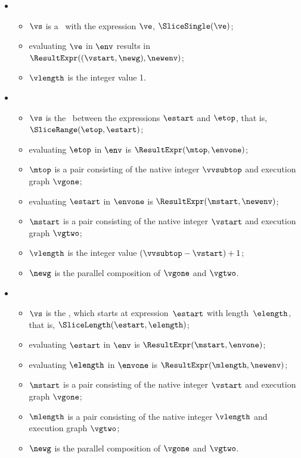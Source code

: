 \ProseParagraph
\OneApplies
\begin{itemize}
  \item {}
  \begin{itemize}
    \item $\vs$ is a \singleslice\ with the expression $\ve$, $\SliceSingle(\ve)$;
    \item evaluating $\ve$ in $\env$ results in $\ResultExpr((\vstart, \newg), \newenv)$\ProseOrAbnormal;
    \item $\vlength$ is the integer value 1.
  \end{itemize}

  \item {}
  \begin{itemize}
    \item $\vs$ is the \rangeslice\ between the
      expressions $\estart$ and $\etop$, that is, \\ $\SliceRange(\etop, \estart)$;
    \item evaluating $\etop$ in $\env$ is $\ResultExpr(\mtop, \envone)$\ProseOrAbnormal;
    \item $\mtop$ is a pair consisting of the native integer $\vvsubtop$ and execution graph $\vgone$;
    \item evaluating $\estart$ in $\envone$ is $\ResultExpr(\mstart, \newenv)$\ProseOrAbnormal;
    \item $\mstart$ is a pair consisting of the native integer $\vstart$ and execution graph $\vgtwo$;
    \item $\vlength$ is the integer value $(\vvsubtop - \vstart) + 1$;
    \item $\newg$ is the parallel composition of $\vgone$ and $\vgtwo$.
  \end{itemize}

  \item {}
  \begin{itemize}
    \item $\vs$ is the \lengthslice, which starts at expression~$\estart$ with length~$\elength$,
    that is, $\SliceLength(\estart, \elength)$;
    \item evaluating $\estart$ in $\env$ is $\ResultExpr(\mstart, \envone)$\ProseOrAbnormal;
    \item evaluating $\elength$ in $\envone$ is $\ResultExpr(\mlength, \newenv)$\ProseOrAbnormal;
    \item $\mstart$ is a pair consisting of the native integer $\vstart$ and execution graph $\vgone$;
    \item $\mlength$ is a pair consisting of the native integer $\vlength$ and execution graph $\vgtwo$;
    \item $\newg$ is the parallel composition of $\vgone$ and $\vgtwo$.
  \end{itemize}


\end{itemize}
